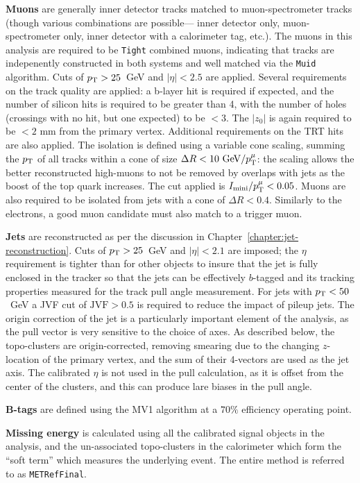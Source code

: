 \textbf{Muons} are generally inner detector tracks matched to muon-spectrometer tracks (though various combinations are possible--- inner detector only, muon-spectrometer only, inner detector with a calorimeter tag, etc.). The muons in this analysis are required to be \texttt{Tight} combined muons, indicating that tracks are indepenently constructed in both systems and well matched via the \texttt{Muid} algorithm. Cuts of $p_{\text{T}} > 25$~GeV and $|\eta|<2.5$ are applied. Several requirements on the track quality are applied: a b-layer hit is required if expected, and the number of silicon hits is required to be greater than 4, with the number of holes (crossings with no hit, but one expected) to be $< 3$. The $|z_0|$ is again required to be $< 2$ mm from the primary vertex. Additional requirements on the TRT hits are also applied. The isolation is defined using a variable cone scaling, summing the $p_{\text{T}}$ of all tracks within a cone of size $\Delta R < 10~\mathrm{GeV} / p_{\text{T}}^{\mu}$: the scaling allows the better reconstructed high-\pt muons to not be removed by overlaps with jets as the boost of the top quark increases. The cut applied is $I_\mathrm{mini} / p_{\text{T}}^{\mu} < 0.05 $.  Muons are also required to be isolated from jets with a cone of $\Delta R < 0.4$. Similarly to the electrons, a good muon candidate must also match to a trigger muon.

\textbf{Jets} are reconstructed as per the discussion in Chapter~\ref{chapter:jet-reconstruction}. Cuts of $p_{\text{T}} > 25$~GeV and $|\eta| < 2.1$ are imposed; the $\eta$ requirement is tighter than for other objects to insure that the jet is fully enclosed in the tracker so that the jets can be effectively $b$-tagged and its tracking properties measured for the track pull angle measurement. For jets with $p_{\text{T}} < 50$~GeV a JVF cut of $\mathrm{JVF} > 0.5$ is required to reduce the impact of pileup jets. The origin correction of the jet is a particularly important element of the analysis, as the pull vector is very sensitive to the choice of axes. As described below, the topo-clusters are origin-corrected, removing smearing due to the changing $z$-location of the primary vertex, and the sum of their 4-vectors are used as the jet axis. The calibrated $\eta$ is not used in the pull calculation, as it is offset from the center of the clusters, and this can produce lare biases in the pull angle.

\textbf{B-tags} are defined using the MV1 algorithm at a $70\%$ efficiency operating point.

\textbf{Missing energy} is calculated using all the calibrated signal objects in the analysis, and the un-associated topo-clusters in the calorimeter which form the ``soft term'' which measures the underlying event. The entire method is referred to as \texttt{METRefFinal}. 


